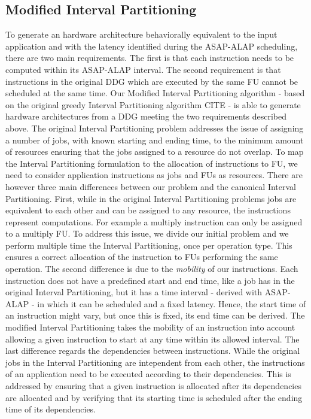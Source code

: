 \subsection{Modified Interval Partitioning}
\label{ssec:modified_interval_partitioning}
To generate an hardware architecture behaviorally equivalent to the input application and with the latency identified during the ASAP-ALAP scheduling, there are two main requirements. The first is that each instruction needs to be computed within its ASAP-ALAP interval. The second requirement is that instructions in the original DDG which are executed by the same FU cannot be scheduled at the same time.
Our Modified Interval Partitioning algorithm - based on the original greedy Interval Partitioning algorithm CITE - is able to generate hardware architectures from a DDG meeting the two requirements described above. The original Interval Partitioning problem addresses the issue of assigning a number of jobs, with known starting and ending time, to the minimum amount of resources ensuring that the jobs assigned to a resource do not overlap. To map the Interval Partitioning formulation to the allocation of instructions to FU, we need to consider application instructions as jobs and FUs as resources. 
There are however three main differences between our problem and the canonical Interval Partitioning. First, while in the original Interval Partitioning problems jobs are equivalent to each other and can be assigned to any resource, the instructions represent computations. For example a multiply instruction can only be assigned to a multiply FU. To address this issue, we divide our initial problem and we perform multiple time the Interval Partitioning, once per operation type. This ensures a correct allocation of the instruction to FUs performing the same operation. The second difference is due to the \textit{mobility} of our instructions. Each instruction does not have a predefined start and end time, like a job has in the original Interval Partitioning, but it has a time interval - derived with ASAP-ALAP - in which it can be scheduled and a fixed latency. Hence, the start time of an instruction might vary, but once this is fixed, its end time can be derived. The modified Interval Partitioning takes the mobility of an instruction into account allowing a given instruction to start at any time within its allowed interval. The last difference regards the dependencies between instructions. While the original jobs in the Interval Partitioning are intependent from each other, the instructions of an application need to be executed according to their dependencies. This is addressed by ensuring that a given instruction is allocated after its dependencies are allocated and by verifying that its starting time is scheduled after the ending time of its dependencies.
